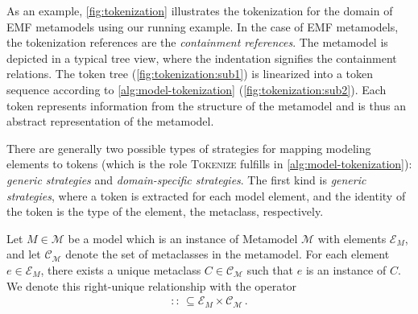 \noindent
As an example, \autoref{fig:tokenization} illustrates the tokenization for the domain of \ac{EMF} metamodels using our running example. In the case of \ac{EMF} metamodels, the tokenization references are the \textit{containment references}. The metamodel is depicted in a typical tree view, where the indentation signifies the containment relations.
The token tree (\autoref{fig:tokenization:sub1}) is linearized into a token sequence according to \autoref{alg:model-tokenization} (\autoref{fig:tokenization:sub2}). Each token represents information from the structure of the metamodel and is thus an abstract representation of the metamodel.

There are generally two possible types of strategies for mapping modeling elements to tokens (which is the role \textsc{Tokenize} fulfills in \autoref{alg:model-tokenization}): \textit{generic strategies} and \textit{domain-specific strategies}.
%
The first kind is \textit{generic strategies}, where a token is extracted for each model element, and the identity of the token is the type of the element, the metaclass, respectively.

\begin{theorem}
Let \(M \in \mathcal{M}\) be a model which is an instance of Metamodel \(\mathcal{M}\) with elements \(\mathcal{E}_M\), and let \(\mathcal{C}_\mathcal{M}\) denote the set of metaclasses in the metamodel. For each element \( e \in \mathcal{E}_M \), there exists a unique metaclass \( C \in \mathcal{C}_\mathcal{M} \) such that \(e\) is an instance of \( C \). We denote this right-unique relationship with the operator
\begin{align*}
:: \, \subseteq \mathcal{E}_M \times \mathcal{C}_\mathcal{M} \,.
\end{align*}
\end{theorem}

